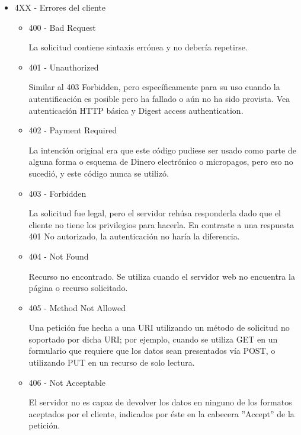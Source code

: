 \documentclass[a4paper,10pt]{article}
\begin{document}
\begin{enumerate}
\begin{enumerate}
\begin{itemize}
                    \item 4XX - Errores del cliente
                        \begin{itemize}
                            \item 400 - Bad Request

                            La solicitud contiene sintaxis errónea y no debería repetirse.

                            \item 401 - Unauthorized

                            Similar al 403 Forbidden, pero específicamente para su uso cuando la autentificación es posible pero ha fallado o aún no ha sido provista. Vea autenticación HTTP básica y Digest access authentication.

                            \item 402 - Payment Required

                            La intención original era que este código pudiese ser usado como parte de alguna forma o esquema de Dinero electrónico o micropagos, pero eso no sucedió, y este código nunca se utilizó. 

                            \item 403 - Forbidden

                            La solicitud fue legal, pero el servidor rehúsa responderla dado que el cliente no tiene los privilegios para hacerla. En contraste a una respuesta 401 No autorizado, la autenticación no haría la diferencia.

                            \item 404 - Not Found

                            Recurso no encontrado. Se utiliza cuando el servidor web no encuentra la página o recurso solicitado.

                            \item 405 - Method Not Allowed

                            Una petición fue hecha a una URI utilizando un método de solicitud no soportado por dicha URI; por ejemplo, cuando se utiliza GET en un formulario que requiere que los datos sean presentados vía POST, o utilizando PUT en un recurso de solo lectura.

                            \item 406 - Not Acceptable

                            El servidor no es capaz de devolver los datos en ninguno de los formatos aceptados por el cliente, indicados por éste en la cabecera ”Accept” de la petición.


\end{itemize}
\end{itemize}
\end{enumerate}
\end{enumerate}
\end{document}
